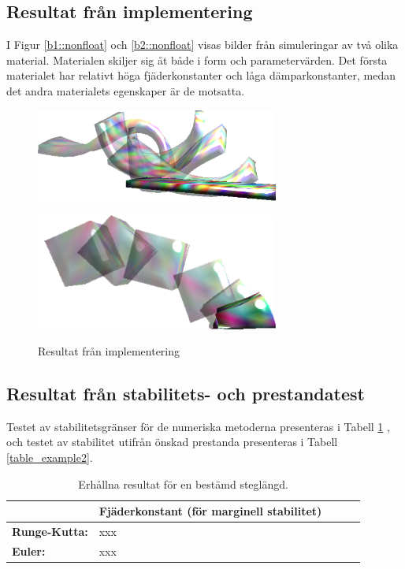 \documentclass[a4paper,12pt,oneside,final,swedish]{extarticle}
\begin{document}
\subsection{Resultat från implementering}
I Figur \ref{b1::nonfloat} och \ref{b2::nonfloat} visas bilder från simuleringar av två olika material. Materialen skiljer sig åt både i form och parametervärden. Det första materialet har relativt höga fjäderkonstanter och låga dämparkonstanter, medan det andra materialets egenskaper är de motsatta.
\begin{figure} [h] 
 \begin{minipage}[b]{.5\linewidth}
    \centering
    \includegraphics[width=8cm]{Bilder/Anim1.png} 
    \subcaption{}\label{b1::nonfloat}
  \end{minipage}
 \begin{minipage}[b]{.5\linewidth}
    \centering
    \includegraphics[width=8cm]{Bilder/Anim2.png} 
    \subcaption{}\label{b2::nonfloat}
  \end{minipage}
  \caption{Resultat från implementering}
  \label{res_imp::nonfloat}
\end{figure}


\subsection{Resultat från stabilitets- och prestandatest}
Testet av stabilitetsgränser för de numeriska metoderna presenteras i Tabell \ref{table_example1} , och testet av stabilitet utifrån önskad prestanda presenteras i Tabell \ref{table_example2}.
\begin{table}[htbp]
    \caption{Erhållna resultat för en bestämd steglängd.}
    \label{table_example1}
    \begin{tabular*}{\hsize}{lllll}
      \hline %
       & \bfseries Fjäderkonstant (för marginell stabilitet)\\
      \hline
      \bfseries Runge-Kutta: & xxx\\
      \bfseries Euler: & xxx\\
      \hline
    \end{tabular*}
\end{table}
\end{document}
